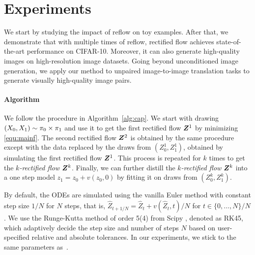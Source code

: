 \section{Experiments}
\label{sec:empirical} 
We start by studying the impact of reflow on toy examples. 
After that, 
we demonstrate that with multiple times of reflow, rectified flow achieves state-of-the-art performance on CIFAR-10. 
Moreover, it can also generate high-quality images on high-resolution image datasets. 
Going beyond unconditioned image generation, we apply our method to unpaired image-to-image translation tasks to generate visually high-quality image pairs. 


\paragraph{Algorithm} 
We follow the procedure in Algorithm~\ref{alg:cap}. 
We start with drawing $(X_0,X_1)\sim {\pi}_0 \times {\pi}_1$ and use it to get the first rectified flow ${\boldsymbol{Z}}^1$ by minimizing \eqref{equ:mainf}.
The second rectified flow ${\boldsymbol{Z}}^2$ is obtained by the same procedure except with the data replaced by the draws from $(Z_0^1,Z_1^1)$, 
obtained by simulating the first rectified flow ${\boldsymbol{Z}}^1$. This process is repeated for $k$ times to get the \emph{$k$-rectified flow} ${\boldsymbol{Z}}^k$.
Finally, we can further distill the  \emph{$k$-rectified flow} ${\boldsymbol{Z}}^k$  into a one step model $z_1= z_0 +  v(z_0, 0)$ by fitting it on draws from $(Z_0^k, Z_1^k)$. 

By default, the ODEs 
are simulated using the vanilla Euler method with constant step size $1/N$ for $N$ steps, that is,  $\hat Z_{t+1/N} = \hat Z_{t} + v(\hat Z_{t}, t)/N$ for $t \in\{0,\ldots, N\}/N$. 
We use the Runge-Kutta method of order 5(4) from Scipy 
\citep{2020SciPy-NMeth}, denoted as RK45, 
which adaptively decide the step size and number of steps $N$ based on  user-specified relative and absolute tolerances.  
In our experiments, we stick to the same parameters as~\cite{song2020score}.


